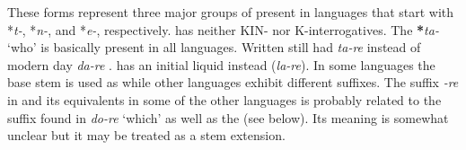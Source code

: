 These forms represent three major groups of  present in  languages that start with *\textit{t-}, *\textit{n-}, and *\textit{e-}, respectively.  has neither KIN- nor K-in\-ter\-rogatives. The   \textbf{*}\textit{ta-} ‘who’ is basically present in all  languages. Written  still had \textit{ta-re} instead of modern day \textit{da-re} \citep[63]{Aston1904}.  has an initial liquid instead (\textit{la-re}). In some languages the base stem is used as  while other languages exhibit different suffixes. The suffix \textit{-re} in  and its equivalents in some of the other languages is probably related to the suffix found in \textit{do-re} ‘which’ as well as the  (see below). Its meaning is somewhat unclear but it may be treated as a stem extension.

